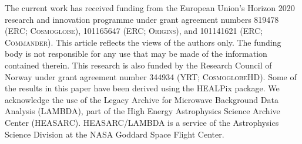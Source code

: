 \documentclass{aa}
\begin{document}
\begin{acknowledgements}
 The current work has received funding from the European Union’s
 Horizon 2020 research and innovation programme under grant agreement
 numbers 819478 (ERC; \textsc{Cosmoglobe}), 101165647 (ERC;
 \textsc{Origins}), and 101141621 (ERC; \textsc{Commander}). This
 article reflects the views of the authors only. The funding body is
 not responsible for any use that may be made of the information
 contained therein. This research is also funded by the Research
 Council of Norway under grant agreement number 344934 (YRT;
 \textsc{CosmoglobeHD}). Some of the results in this paper have been
 derived using the HEALPix \citep{healpix} package.  We acknowledge
 the use of the Legacy Archive for Microwave Background Data Analysis
 (LAMBDA), part of the High Energy Astrophysics Science Archive Center
 (HEASARC). HEASARC/LAMBDA is a service of the Astrophysics Science
 Division at the NASA Goddard Space Flight Center.
\end{acknowledgements}


%



\end{document}
